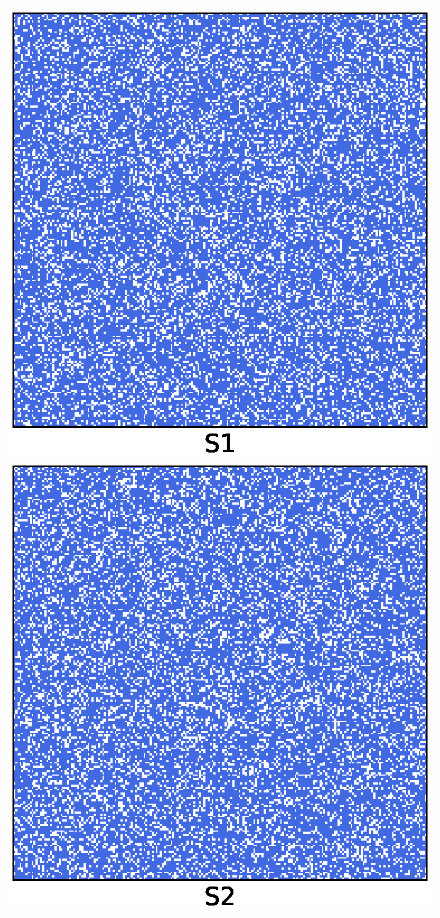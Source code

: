 \begin{figure}[hbtp]
    \hfill
    \begin{minipage}[c]{0.45\textwidth}
        \centering 
        \includegraphics*[scale=0.45]{images/ising/mixing_S1_after}
    \end{minipage}
    \hfill
    \begin{minipage}[c]{0.45\textwidth}
        \centering 
        \includegraphics*[scale=0.45]{images/ising/mixing_S2_after}

\end{minipage}
\end{figure}

